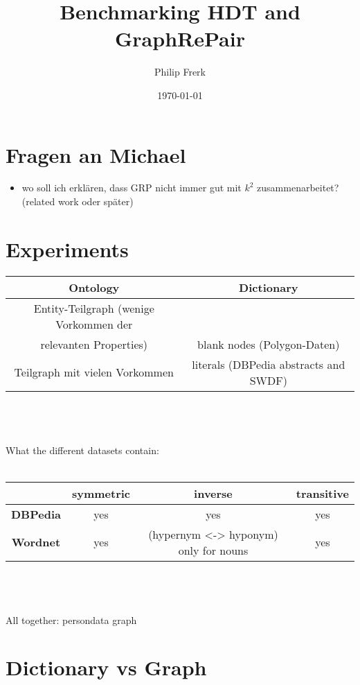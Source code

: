 \documentclass[a4paper]{scrartcl}
\title{Benchmarking HDT and GraphRePair}
\author{Philip Frerk}
\date{\today}
\begin{document}
\maketitle


\section{Fragen an Michael}

\begin{itemize}
	\item wo soll ich erklären, dass GRP nicht immer gut mit $k^2$ zusammenarbeitet? (related work oder später)
\end{itemize}

\section{Experiments}

\begin{tabular}{|c|c|}
	\hline 
	\textbf{Ontology} & \textbf{Dictionary} \\ 
	\hline 
	Entity-Teilgraph (wenige Vorkommen der \\relevanten Properties) & blank nodes (Polygon-Daten) \\ 
	\hline 
	Teilgraph mit vielen Vorkommen & literals (DBPedia abstracts and SWDF) \\ 
	\hline 
\end{tabular} 
\\\\\\What the different datasets contain:\\\\
\begin{tabular}{|c|c|c|c|}
	\hline 
	& \textbf{symmetric} & \textbf{inverse} & \textbf{transitive} \\ 
	\hline 
	\textbf{DBPedia} & yes & yes & yes \\ 
	\hline 
	\textbf{Wordnet} & yes & (hypernym <-> hyponym) only for nouns & yes \\ 
	\hline 
\end{tabular} 
\\\\\\All together: persondata graph

\section{Dictionary vs Graph}
\end{document}
